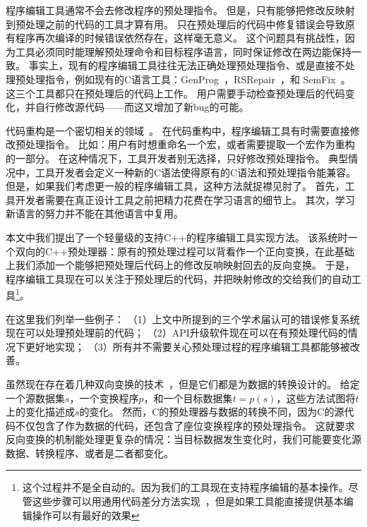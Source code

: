 程序编辑工具通常不会去修改程序的预处理指令。
但是，只有能够把修改反映射到预处理之前的代码的工具才算有用。
只在预处理后的代码中修复错误会导致原有程序再次编译的时候错误依然存在，这样毫无意义。
这个问题具有挑战性，因为工具必须同时能理解预处理命令和目标程序语言，同时保证修改在两边能保持一致。
事实上，现有的程序编辑工具往往无法正确处理预处理指令、或是直接不处理预处理指令，例如现有的C语言工具：GenProg~\parencite{le2012genprog,le2012systematic}，RSRepair~\parencite{QiMLDW14}，和
SemFix~\parencite{nguyen2013semfix}。
这三个工具都只在预处理后的代码上工作。
用户需要手动检查预处理后的代码变化，并自行修改源代码——而这又增加了新bug的可能。

代码重构是一个密切相关的领域~\parencite{McCloskey:2005,Garrido2013}。
在代码重构中，程序编辑工具有时需要直接修改预处理指令。
比如：用户有时想重命名一个宏，或者需要提取一个宏作为重构的一部分。
在这种情况下，工具开发者别无选择，只好修改预处理指令。
典型情况中，工具开发者会定义一种新的C语法使得原有的C语法和预处理指令能兼容。
但是，如果我们考虑更一般的程序编辑工具，这种方法就捉襟见肘了。
首先，工具开发者需要在真正设计工具之前把精力花费在学习语言的细节上。
其次，学习新语言的努力并不能在其他语言中复用。

本文中我们提出了一个轻量级的支持C++的程序编辑工具实现方法。
该系统时一个双向的C++预处理器：原有的预处理过程可以背看作一个正向变换，在此基础上我们添加一个能够把预处理后代码上的修改反响映射回去的反向变换。
于是，程序编辑工具现在可以关注于预处理后的代码，并把映射修改的交给我们的自动工具\footnote{这个过程并不是全自动的。因为我们的工具现在支持程序编辑的基本操作。尽管这些步骤可以用通用代码差分方法实现~\parencite{fluri2007change}，但是如果工具能直接提供基本编辑操作可以有最好的效果}。




在这里我们列举一些例子：
（1）上文中所提到的三个学术届认可的错误修复系统现在可以处理预处理前的代码；
（2）API升级软件现在可以在有预处理代码的情况下更好地实现；
（3）所有并不需要关心预处理过程的程序编辑工具都能够被改善。


虽然现在存在着几种双向变换的技术~\parencite{MaHNHT07,Voigtlander09bff,voigtlander2010combining}，但是它们都是为数据的转换设计的。
给定一个源数据集$s$，一个变换程序$p$，和一个目标数据集$t=p(s)$，这些方法试图将$t$上的变化描述成$s$的变化。
然而，C的预处理器与数据的转换不同，因为C的源代码不仅包含了作为数据的代码，还包含了座位变换程序的预处理指令。
这就要求反向变换的机制能处理更复杂的情况：当目标数据发生变化时，我们可能要变化源数据、转换程序、或者是二者都变化。

